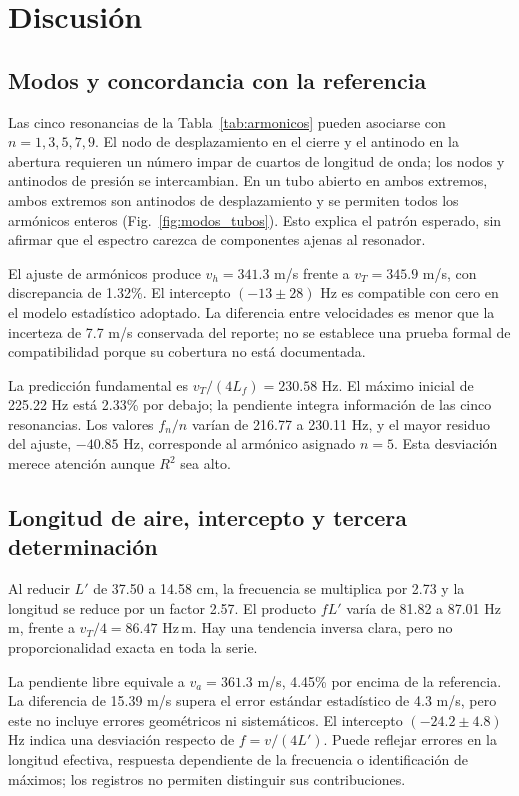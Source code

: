 \section{Discusión}
\subsection{Modos y concordancia con la referencia}
Las cinco resonancias de la Tabla~\ref{tab:armonicos} pueden asociarse con $n=1,3,5,7,9$. El nodo de desplazamiento en el cierre y el antinodo en la abertura requieren un número impar de cuartos de longitud de onda; los nodos y antinodos de presión se intercambian. En un tubo abierto en ambos extremos, ambos extremos son antinodos de desplazamiento y se permiten todos los armónicos enteros (Fig.~\ref{fig:modos_tubos}). Esto explica el patrón esperado, sin afirmar que el espectro carezca de componentes ajenas al resonador.

El ajuste de armónicos produce $v_h=341.3$ m/s frente a $v_T=345.9$ m/s, con discrepancia de 1.32\%. El intercepto $(-13\pm28)$ Hz es compatible con cero en el modelo estadístico adoptado. La diferencia entre velocidades es menor que la incerteza de 7.7 m/s conservada del reporte; no se establece una prueba formal de compatibilidad porque su cobertura no está documentada.

La predicción fundamental es $v_T/(4L_f)=230.58$ Hz. El máximo inicial de 225.22 Hz está 2.33\% por debajo; la pendiente integra información de las cinco resonancias. Los valores $f_n/n$ varían de 216.77 a 230.11 Hz, y el mayor residuo del ajuste, $-40.85$ Hz, corresponde al armónico asignado $n=5$. Esta desviación merece atención aunque $R^2$ sea alto.

\subsection{Longitud de aire, intercepto y tercera determinación}
Al reducir $L'$ de 37.50 a 14.58 cm, la frecuencia se multiplica por 2.73 y la longitud se reduce por un factor 2.57. El producto $fL'$ varía de 81.82 a 87.01 Hz\,m, frente a $v_T/4=86.47$ Hz\,m. Hay una tendencia inversa clara, pero no proporcionalidad exacta en toda la serie.

La pendiente libre equivale a $v_a=361.3$ m/s, 4.45\% por encima de la referencia. La diferencia de 15.39 m/s supera el error estándar estadístico de 4.3 m/s, pero este no incluye errores geométricos ni sistemáticos. El intercepto $(-24.2\pm4.8)$ Hz indica una desviación respecto de $f=v/(4L')$. Puede reflejar errores en la longitud efectiva, respuesta dependiente de la frecuencia o identificación de máximos; los registros no permiten distinguir sus contribuciones.

